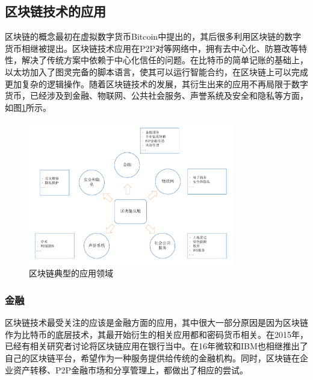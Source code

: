\subsection{区块链技术的应用}

区块链的概念最初在虚拟数字货币Bitcoin中提出的\cite{nakamoto2008bitcoin}，其后很多利用区块链的数字货币相继被提出。区块链技术应用在P2P对等网络中，拥有去中心化、防篡改等特性，解决了传统方案中依赖于中心化信任的问题。在比特币的简单记账的基础上，以太坊\cite{buterin2013ethereum}加入了图灵完备的脚本语言，使其可以运行智能合约，在区块链上可以完成更加复杂的逻辑操作。随着区块链技术的发展，其衍生出来的应用不再局限于数字货币，已经涉及到金融、物联网、公共社会服务、声誉系统及安全和隐私等方面\cite{zheng2016blockchain}，如图\ref{fig:applications}所示。

\begin{figure}[htbp]
 	\centering
 	\includegraphics[width = 0.8\textwidth]{img/applications}
 	\caption{区块链典型的应用领域}\label{fig:applications}
\end{figure}


\subsubsection{金融}

区块链技术最受关注的应该是金融方面的应用，其中很大一部分原因是因为区块链作为比特币的底层技术，其最开始衍生的相关应用都和密码货币相关。在2015年，已经有相关研究者讨论将区块链应用在银行当中\cite{peters2015trends}。在16年微软和IBM也相继推出了自己的区块链平台，希望作为一种服务提供给传统的金融机构。同时，区块链在企业资产转移、P2P金融市场和分享管理上，都做出了相应的尝试。

